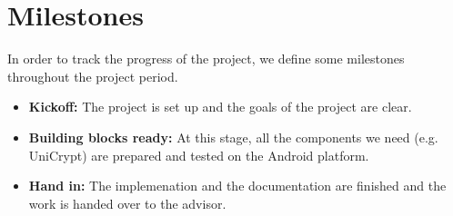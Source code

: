 \documentclass[numbers=noenddot, abstract=on, a4paper, headsepline,
footsepline, oneside, draft=off]{scrreprt}
\begin{document}
\section{Milestones}
\label{sec:milestones}
In order to track the progress of the project, we define some milestones
throughout the project period.
\begin{itemize}
  \item \textbf{Kickoff:} The project is set up and the goals of the project
  are clear.
  \item \textbf{Building blocks ready:} At this stage, all the components we
  need (e.g. UniCrypt) are prepared and tested on the Android platform.
  \item \textbf{Hand in:} The implemenation and the documentation are finished
  and the work is handed over to the advisor.
\end{itemize}

\printbibliography
\end{document}
